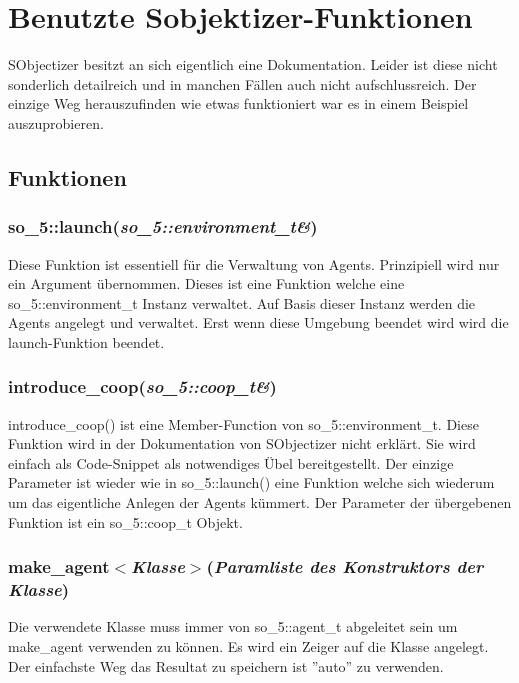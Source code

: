 \chapter{Benutzte Sobjektizer-Funktionen}

\vspace{10mm}

SObjectizer besitzt an sich eigentlich eine Dokumentation. Leider ist diese
nicht sonderlich detailreich und in manchen Fällen auch nicht aufschlussreich.
Der einzige Weg herauszufinden wie etwas funktioniert war es in einem Beispiel auszuprobieren.

\section{Funktionen}

\subsection{so\_5::launch(\textit{so\_5::environment\_t\&})}
Diese Funktion ist essentiell für die Verwaltung von Agents. Prinzipiell wird nur ein Argument übernommen.
Dieses ist eine Funktion welche eine so\_5::environment\_t Instanz verwaltet. Auf Basis dieser Instanz werden
die Agents angelegt und verwaltet. Erst wenn diese Umgebung beendet wird wird die launch-Funktion beendet.

\subsection{introduce\_coop(\textit{so\_5::coop\_t\&})}
introduce\_coop() ist eine Member-Function von so\_5::environment\_t. Diese Funktion wird in der Dokumentation von
SObjectizer nicht erklärt. Sie wird einfach als Code-Snippet als notwendiges Übel bereitgestellt. Der einzige
Parameter ist wieder wie in so\_5::launch() eine Funktion welche sich wiederum um das eigentliche Anlegen der
Agents kümmert. Der Parameter der übergebenen Funktion ist ein so\_5::coop\_t Objekt.

\subsection{make\_agent$<$\textit{Klasse}$>$(\textit{Paramliste des Konstruktors der Klasse})}
Die verwendete Klasse muss immer von so\_5::agent\_t abgeleitet sein um make\_agent verwenden zu können.
Es wird ein Zeiger auf die Klasse angelegt. Der einfachste Weg das Resultat zu speichern ist ''auto'' zu
verwenden.

